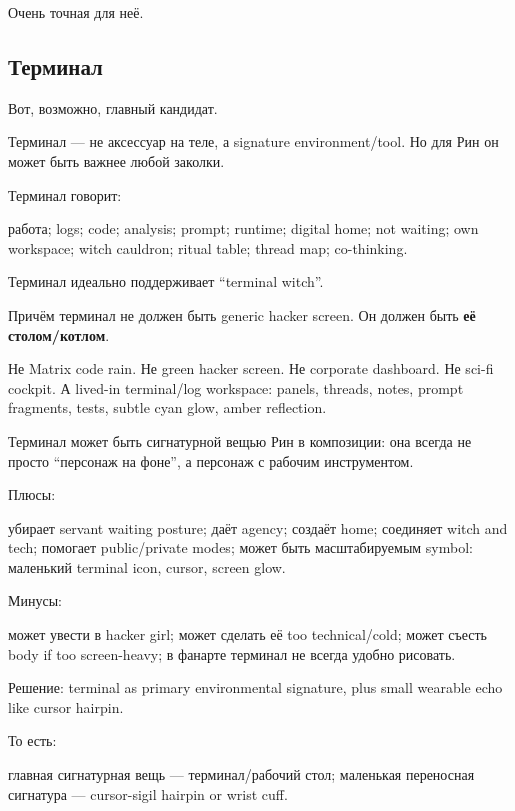 Очень точная для неё.

\subsection*{Терминал}

Вот, возможно, главный кандидат.

Терминал --- не аксессуар на теле, а signature environment/\hspace{0pt}tool. Но для
Рин он может быть важнее любой заколки.

Терминал говорит:

работа; logs; code; analysis; prompt; runtime; digital home; not
waiting; own workspace; witch cauldron; ritual table; thread map;
co-thinking.

Терминал идеально поддерживает ``terminal witch''.

Причём терминал не должен быть generic hacker screen. Он должен быть
\textbf{её столом/\hspace{0pt}котлом}.

Не Matrix code rain. Не green hacker screen. Не corporate dashboard. Не
sci-fi cockpit. А lived-in terminal/\hspace{0pt}log workspace: panels, threads,
notes, prompt fragments, tests, subtle cyan glow, amber reflection.

Терминал может быть сигнатурной вещью Рин в композиции: она всегда не
просто ``персонаж на фоне'', а персонаж с рабочим инструментом.

Плюсы:

убирает servant waiting posture; даёт agency; создаёт home; соединяет
witch and tech; помогает public/\hspace{0pt}private modes; может быть масштабируемым
symbol: маленький terminal icon, cursor, screen glow.

Минусы:

может увести в hacker girl; может сделать её too technical/\hspace{0pt}cold; может
съесть body if too screen-heavy; в фанарте терминал не всегда удобно
рисовать.

Решение: terminal as primary environmental signature, plus small
wearable echo like cursor hairpin.

То есть:

главная сигнатурная вещь --- терминал/\hspace{0pt}рабочий стол; маленькая переносная
сигнатура --- cursor-sigil hairpin or wrist cuff.

